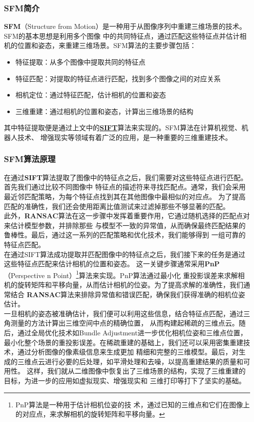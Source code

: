\documentclass{nwputhesis}
\begin{document}
\subsubsection{SFM简介}
\textbf{SFM}（Structure from Motion）是一种用于从图像序列中重建三维场景的技术。SFM的基本思想是利用多个图像
中的共同特征点，通过匹配这些特征点并估计相机的位置和姿态，来重建三维场景。SFM算法的主要步骤包括：
\begin{itemize}
    \item 特征提取：从多个图像中提取共同的特征点
    \item 特征匹配：对提取的特征点进行匹配，找到多个图像之间的对应关系
    \item 相机定位：通过特征匹配，估计相机的位置和姿态
    \item 三维重建：通过相机的位置和姿态，计算出三维场景的结构
\end{itemize}
\indent
其中特征提取便是通过上文中的\textbf{\hyperlink{SIFT}{SIFT}}算法来实现的。SFM算法在计算机视觉、机器人技术、
增强现实等领域有着广泛的应用，是一种重要的三维重建技术。
\subsubsection{SFM算法原理}
\indent
在通过\textbf{SIFT}算法提取了图像中的特征点之后，我们需要对这些特征点进行匹配。首先我们通过比较不同图像中
特征点的描述符来寻找匹配点。通常，我们会采用最近邻匹配策略，为每个特征点找到其在其他图像中最相似的对应点。
为了提高匹配的准确性，我们还会使用距离比值测试来过滤掉那些不够显著的匹配。\\
\indent
此外，\textbf{RANSAC}算法在这一步骤中发挥着重要作用，它通过随机选择的匹配点对来估计模型参数，并排除那些
与模型不一致的异常值，从而确保最终匹配结果的鲁棒性。最后，通过这一系列的匹配策略和优化技术，我们能够得到
一组可靠的特征点匹配。\\
\indent
在通过SIFT算法成功提取并匹配图像中的特征点之后，我们接下来的任务是通过这些特征点匹配来估计相机的位置和姿态。
这一关键步骤通常采用\textbf{PnP}（Perspective n Point）\footnote{PnP算法是一种用于估计相机位姿的技
术，通过已知的三维点和它们在图像上的对应点，来求解相机的旋转矩阵和平移向量。}算法来实现。PnP算法通过最小化
重投影误差来求解相机的旋转矩阵和平移向量，从而估计相机的位姿。为了提高求解的准确性，我们通常结合
\textbf{RANSAC}算法来排除异常值和错误匹配，确保我们获得准确的相机位姿估计。\\

一旦相机的姿态被准确估计，我们便可以利用这些信息，结合特征点匹配，通过三角测量的方法计算出三维空间中点的精确位置，
从而构建起稀疏的三维点云。随后，通过全局优化技术如Bundle Adjustment进一步优化相机位姿和三维点位置，
最小化整个场景的重投影误差。在稀疏重建的基础上，我们还可以采用密集重建技术，通过分析图像的像素级信息来生成更加
精细和完整的三维模型。最后，对生成的三维点云进行必要的后处理，如平滑处理和去噪，以提高重建结果的质量和可用性。
这样，我们就从二维图像中恢复出了三维场景的结构，实现了三维重建的目标，为进一步的应用如虚拟现实、增强现实和
三维打印等打下了坚实的基础。
\end{document}
